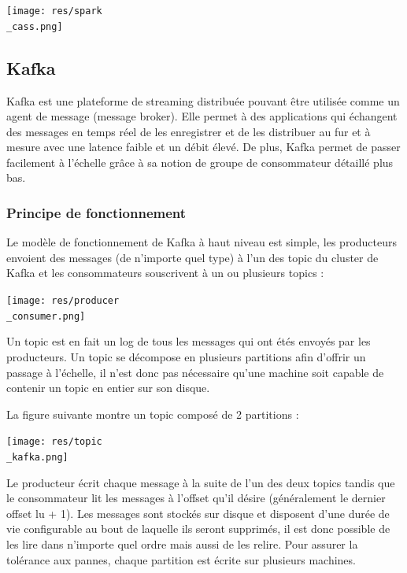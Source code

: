 \documentclass[a4paper, 11pt, titlepage]{article}
\begin{document}
\begin{center}
\texttt{[image: res/spark\\\_cass.png]}
\end{center}

\newpage
\subsection {Kafka}

Kafka est une plateforme de streaming distribuée pouvant être utilisée comme un agent de message (message broker). Elle permet à des applications qui échangent des messages en temps réel de les enregistrer et de les distribuer au fur et à mesure avec une latence faible et un débit élevé. De plus, Kafka permet de passer facilement à l'échelle grâce à sa notion de groupe de consommateur détaillé plus bas.


\subsubsection* {Principe de fonctionnement}

Le modèle de fonctionnement de Kafka à haut niveau est simple, les producteurs envoient des messages (de n'importe quel type) à l'un des topic du cluster de Kafka et les consommateurs souscrivent à un ou plusieurs topics :

\begin{center}
\texttt{[image: res/producer\\\_consumer.png]}
\end{center}

Un topic est en fait un log de tous les messages qui ont étés envoyés par les producteurs. Un topic se décompose en plusieurs partitions afin d'offrir un passage à l'échelle, il n'est donc pas nécessaire qu'une machine soit capable de contenir un topic en entier sur son disque.


La figure suivante montre un topic composé de 2 partitions :

\begin{center}
\texttt{[image: res/topic\\\_kafka.png]}
\end{center}

Le producteur écrit chaque message à la suite de l'un des deux topics tandis que le consommateur lit les messages à l'offset qu'il désire (généralement le dernier offset lu + 1).
Les messages sont stockés sur disque et disposent d'une durée de vie configurable au bout de laquelle ils seront supprimés, il est donc possible de les lire dans n'importe quel ordre mais aussi de les relire.
Pour assurer la tolérance aux pannes, chaque partition est écrite sur plusieurs machines.
\end{document}
